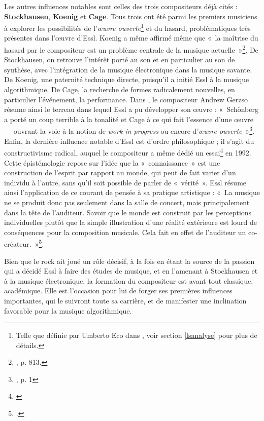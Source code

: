 \documentclass[a4paper,12pt]{article}
\newcommand{\guill}[1]{«~#1~»}
\begin{document}
Les autres influences notables sont celles des trois compositeurs déjà cités : \textbf{Stockhausen}, \textbf{Koenig} et \textbf{Cage}. Tous trois ont été parmi les premiers musiciens à explorer les possibilités de l'\emph{œuvre ouverte}\footnote{Telle que définie par Umberto Eco dans \cite{eco1962opera}, voir section \ref{lsanalyse} pour plus de détails.} et du hasard, problématiques très présentes dans l'œuvre d'Essl. Koenig a même affirmé même que \guill{la maîtrise du hasard par le compositeur est un problème centrale de la musique actuelle}\footnote{\cite{koenigkommentar}, p. 813.}. De Stockhausen, on retrouve l'intérêt porté au son et en particulier au son de synthèse, avec l'intégration de la musique électronique dans la musique savante. De Koenig, une paternité technique directe, puisqu'il a initié Essl à la musique algorithmique. De Cage, la recherche de formes radicalement nouvelles, en particulier l'événement, la performance. Dans \cite{assayag2009new}, le compositeur Andrew Gerzso résume ainsi le terreau dans lequel Essl a pu développer son œuvre : \guill{Schönberg a porté un coup terrible à la tonalité et Cage à ce qui fait l'essence d'une œuvre --- ouvrant la voie à la notion de \emph{work-in-progress} ou encore d'\emph{œuvre ouverte}}\footnote{\cite{assayag2009new}, p. 1}. \\
Enfin, la dernière influence notable d'Essl est d'ordre philosophique ; il s'agit du constructivisme radical, auquel le compositeur a même dédié un essai\footnote{\cite{radikalenkonstruktivismus}} en 1992. Cette épistémologie repose sur l'idée que la \guill{connaissance} est une construction de l'esprit par rapport au monde, qui peut de fait varier d'un individu à l'autre, sans qu'il soit possible de parler de \guill{vérité}. Essl résume ainsi l'application de ce courant de pensée à sa pratique artistique : \guill{La musique ne se produit donc pas seulement dans la salle de concert, mais principalement dans la tête de l'auditeur. Savoir que le monde est construit par les perceptions individuelles plutôt que la simple illustration d'une réalité extérieure est lourd de conséquences pour la composition musicale. Cela fait en effet de l'auditeur un co-créateur.}\footnote{\cite{sinefine}.}.


Bien que le rock ait joué un rôle décisif, à la fois en étant la source de la passion qui a décidé Essl à faire des études de musique, et en l'amenant à Stockhausen et à la musique électronique, la formation du compositeur est avant tout classique, académique. Elle est l'occasion pour lui de forger ses premières influences importantes, qui le suivront toute sa carrière, et de manifester une inclination favorable pour la musique algorithmique.
\end{document}
